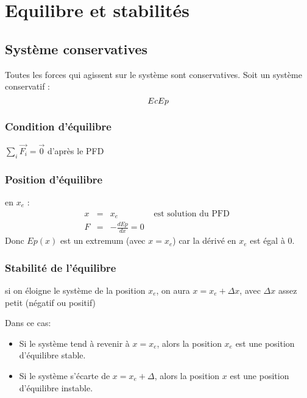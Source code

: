 \section{Equilibre et stabilités}

\subsection{Système conservatives}

Toutes les forces qui agissent sur le système sont conservatives. Soit un système conservatif :\[Ec ~\\ Ep\]



				
\subsubsection{Condition d'équilibre} $\sum_i \vec{F_i} = \vec{0}$ d'après le PFD
\subsubsection{ Position d'équilibre} en $x_e$ :\[\begin{array}{rccl}
				x &=& x_e & \text{ est solution du PFD } \\
		F &=& -\frac{dEp}{dx} = 0\end{array}\]
		Donc $Ep(x)$ est un extremum (avec $x=x_ e$) car la dérivé en $x_e$ est égal à 0.
		\subsubsection{Stabilité de l'équilibre} si on éloigne le système de la position $x_e$, on aura $x = x_e + \Delta x$, avec $\Delta x$ assez petit (négatif ou positif)

Dans ce cas:
\begin{itemize}
	\item Si le système tend à revenir à $x=x_e$, alors la position $x_e$ est une position d'équilibre stable.
	\item Si le système s'écarte de $x=x_e + \Delta$, alors la position $x$ est une position d'équilibre instable.
\end{itemize}

